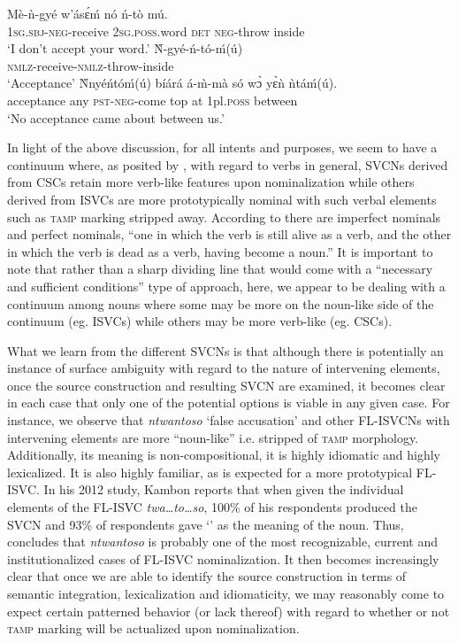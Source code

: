\documentclass[output=paper,modfonts,nonflat,
colorlinks, citecolor=brown,
]{langsci/langscibook}
\begin{document}
\ea\label{ex:duah:21}
\ea\label{ex:duah:21a}
\gll Mè-ǹ-gyé w’ásɛ́ḿ nó ń-tò mú.\\
1\textsc{sg}.\textsc{sbj}-\textsc{neg}-receive	2\textsc{sg}.\textsc{poss}.word \textsc{det}	\textsc{neg}-throw inside\\
\glt `I don’t accept your word.'
\ex\label{ex:duah:21b}
\gll Ǹ-gyé-ń-tó-ḿ(ú)\\
\textsc{nmlz}-receive-\textsc{nmlz}-throw-inside\\
\glt `Acceptance'
\ex\label{ex:duah:21c}
\gll Ǹnyéńtóḿ(ú)	bíárá á-m̀-mà só wɔ̀ yɛ̀ǹ ǹtáḿ(ú).\\
acceptance any \textsc{pst}-\textsc{neg}-come top at 1pl.\textsc{poss} between\\
\glt `No acceptance came about between us.'
\z
\z

In light of the above discussion, for all intents and purposes, we seem to have a continuum where, as posited by \citet{vendler1967}, with regard to verbs in general, SVCNs derived from CSCs retain more verb-like features upon nominalization while others derived from ISVCs are more prototypically nominal with such verbal elements such as \textsc{tamp} marking stripped away. According to \citet[131]{vendler1967} there are {imperfect nominals} and {perfect nominals}, “one in which the verb is still alive as a verb, and the other in which the verb is dead as a verb, having become a noun.” It is important to note that rather than a sharp dividing line that would come with a “necessary and sufficient conditions” type of approach, here, we appear to be dealing with a continuum among nouns where some may be more on the noun-like side of the continuum (eg. ISVCs) while others may be more verb-like (eg. CSCs). 

What we learn from the different SVCNs is that although there is potentially an instance of surface ambiguity with regard to the nature of intervening elements, once the source construction and resulting SVCN are examined, it becomes clear in each case that only one of the potential options is viable in any given case. For instance, we observe that \textit{ntwantoso} ‘{false accusation}’ and other FL-ISVCNs with intervening elements are more “noun-like” i.e. stripped of \textsc{tamp} morphology. Additionally, its meaning is non-compositional, it is highly idiomatic and highly lexicalized. It is also highly familiar, as is expected for a more prototypical FL-ISVC. In his 2012 study, Kambon reports that when given the individual elements of the FL-ISVC \textit{twa…to…so}, 100\% of his respondents produced the SVCN and 93\% of respondents gave ‘’ as the meaning of the noun. Thus, \citet{kambon2012} concludes that \textit{ntwantoso} is probably one of the most recognizable, current and institutionalized cases of FL-ISVC nominalization. It then becomes increasingly clear that once we are able to identify the source construction in terms of semantic integration, lexicalization and idiomaticity, we may reasonably come to expect certain patterned behavior (or lack thereof) with regard to whether or not \textsc{tamp} marking will be actualized upon nominalization. 
\end{document}
